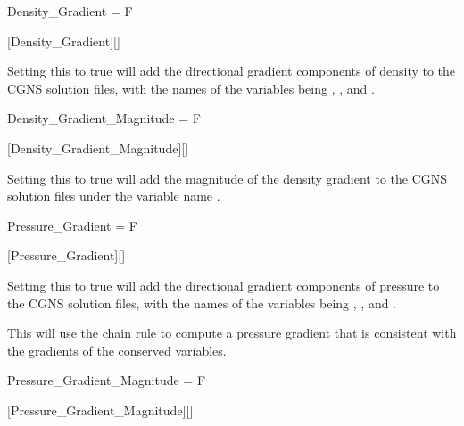 
\begin{nmldescitem}
Density_Gradient = F
\end{nmldescitem}
[Density\_Gradient][]

\begin{nmldescbody}
Setting this to true will add the directional gradient components of density
to the CGNS solution files, with the names of the variables being
, , and .
\end{nmldescbody}


\FINALFIX{\newpage}
\begin{nmldescitem}
Density_Gradient_Magnitude = F
\end{nmldescitem}
[Density\_Gradient\_Magnitude][]

\begin{nmldescbody}
Setting this to true will add the magnitude of the density gradient
to the CGNS solution files under the variable name .
\end{nmldescbody}


\begin{nmldescitem}
Pressure_Gradient = F
\end{nmldescitem}
[Pressure\_Gradient][]

\begin{nmldescbody}
Setting this to true will add the directional gradient components of pressure
to the CGNS solution files, with the names of the variables being
, , and .

\noindent\NOTE
This will use the chain rule to compute a pressure gradient that is consistent
with the gradients of the conserved variables.
\end{nmldescbody}


\begin{nmldescitem}
Pressure_Gradient_Magnitude = F
\end{nmldescitem}
[Pressure\_Gradient\_Magnitude][]

